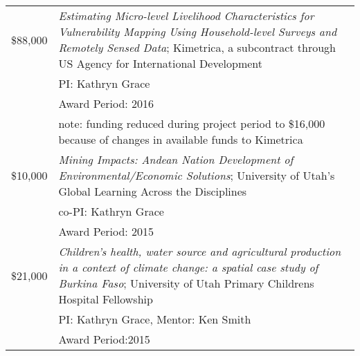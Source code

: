 \documentclass[11pt]{article} %
\begin{document}
\begin{tabular}{lp{11cm}}
\$88,000& \emph{Estimating Micro-level Livelihood Characteristics for Vulnerability Mapping Using Household-level Surveys and Remotely Sensed Data}; Kimetrica, a subcontract through US Agency for International Development\\
&PI: Kathryn Grace\\
&Award Period: 2016\\
&note: funding reduced during project period to \$16,000 because of changes in available funds to Kimetrica\\



\$10,000& \emph{Mining Impacts: Andean Nation Development of Environmental/Economic Solutions}; University of Utah's Global Learning Across the Disciplines\\
&co-PI: Kathryn Grace\\
&Award Period: 2015\\



\$21,000& \emph{Children's health, water source and agricultural production in a context of climate change: a spatial case study of Burkina Faso}; University of Utah Primary Childrens Hospital Fellowship\\
&PI: Kathryn Grace, Mentor: Ken Smith\\
&Award Period:2015\\

 \end{tabular}
\end{document}
